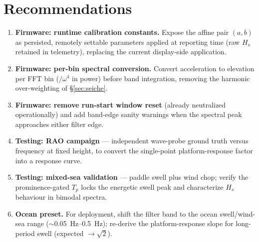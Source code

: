 \documentclass[11pt,a4paper]{article}
\begin{document}
\section{Recommendations}
\label{sec:recs}
\begin{enumerate}
  \item \textbf{Firmware: runtime calibration constants.} Expose the affine
        pair $(a, b)$ as persisted, remotely settable parameters applied at
        reporting time (raw $H_s$ retained in telemetry), replacing the
        current display-side application.
  \item \textbf{Firmware: per-bin spectral conversion.} Convert acceleration
        to elevation per FFT bin ($/\omega^4$ in power) before band
        integration, removing the harmonic over-weighting of
        \S\ref{sec:seiche}.
  \item \textbf{Firmware: remove run-start window reset} (already neutralized
        operationally) and add band-edge sanity warnings when the spectral
        peak approaches either filter edge.
  \item \textbf{Testing: RAO campaign} --- independent wave-probe ground
        truth versus frequency at fixed height, to convert the single-point
        platform-response factor into a response curve.
  \item \textbf{Testing: mixed-sea validation} --- paddle swell plus wind
        chop; verify the prominence-gated $T_p$ locks the energetic swell
        peak and characterize $H_s$ behaviour in bimodal spectra.
  \item \textbf{Ocean preset.} For deployment, shift the filter band to the
        ocean swell/wind-sea range ($\sim$\SIrange{0.05}{0.5}{\hertz});
        re-derive the platform-response slope for long-period swell (expected
        $\to \sqrt{2}$).
\end{enumerate}
\end{document}

